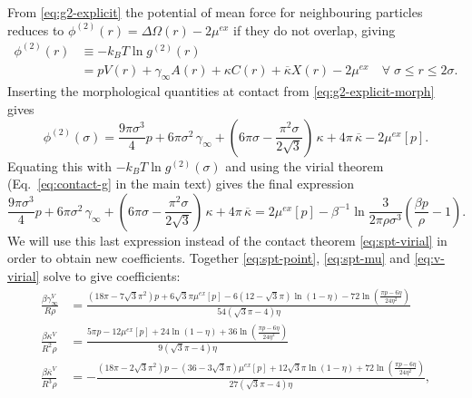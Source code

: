 \documentclass[11pt]{report}
\begin{document}
From \eqref{eq:g2-explicit} the potential of mean force for neighbouring particles reduces to $\phi^{(2)}(r) = \Delta\Omega(r) - 2\mu^{ex}$ if they do not overlap, giving
\begin{equation}
  \begin{split}
  \phi^{(2)}(r) &\equiv - k_B T \ln g^{(2)}(r) \\
  &= pV(r) + \gamma_\infty A(r) + \kappa C(r) + \overline{\kappa} X(r) - 2\mu^{ex}
  \quad \forall \; \sigma \le r \le 2\sigma.
  \end{split}
\end{equation}
Inserting the morphological quantities at contact from \eqref{eq:g2-explicit-morph} gives
\begin{equation}
  \phi^{(2)}(\sigma) =
  \frac{9\pi \sigma^3}{4} p +
  6\pi\sigma^2 \, \gamma_\infty +
  \left( 6\pi\sigma - \frac{\pi^2\sigma}{2\sqrt{3}} \right) \, \kappa +
  4\pi \, \overline{\kappa}
  - 2\mu^{ex}[p].
\end{equation}
Equating this with $-k_B T \ln g^{(2)}(\sigma)$ and using the virial theorem (Eq.\ \eqref{eq:contact-g} in the main text) gives the final expression
\begin{equation}\label{eq:v-virial}
  \frac{9\pi \sigma^3}{4} p +
  6\pi\sigma^2 \, \gamma_\infty +
  \left( 6\pi\sigma - \frac{\pi^2\sigma}{2\sqrt{3}} \right) \, \kappa +
  4\pi \, \overline{\kappa} =
  2\mu^{ex}[p] - \beta^{-1} \ln{\frac{3}{2\pi \rho \sigma^3} \left( \frac{\beta p}{\rho} - 1 \right)}.
\end{equation}
We will use this last expression instead of the contact theorem \eqref{eq:spt-virial} in order to obtain new coefficients.
Together \eqref{eq:spt-point}, \eqref{eq:spt-mu} and \eqref{eq:v-virial} solve to give coefficients:
\begin{subequations}
  \begin{align}
    \frac{\beta \gamma_\infty^{V}}{R\rho} &=
    \frac{ (18\pi - 7\sqrt{3} \pi^2) p + 6\sqrt{3}\pi \mu^{ex}[p]
      - 6(12 - \sqrt{3}\pi) \ln{(1-\eta)}
      - 72\ln{\left( \frac{\pi p - 6\eta}{24\eta^2} \right)} }
    {54(\sqrt{3}\pi - 4) \eta}
    \label{eq:virial-gamma}
    \\
    \frac{\beta \kappa^{V}}{R^2\rho} &=
    \frac{ 5\pi p - 12 \mu^{ex}[p] + 24 \ln{(1-\eta)}
      + 36\ln{\left( \frac{\pi p - 6\eta}{24\eta^2} \right)} }
    {9(\sqrt{3}\pi - 4) \eta}
    \\
    \frac{\beta \overline{\kappa}^{V}}{R^3\rho} &=
    - \frac{
      (18\pi - 2\sqrt{3} \pi^2) p - (36 - 3\sqrt{3}\pi) \mu^{ex}[p] + 12\sqrt{3}\pi \ln{(1-\eta)}
      + 72\ln{\left( \frac{\pi p - 6\eta}{24\eta^2} \right)} }
    {27(\sqrt{3}\pi - 4) \eta},
  \end{align}
\end{subequations}
\end{document}
